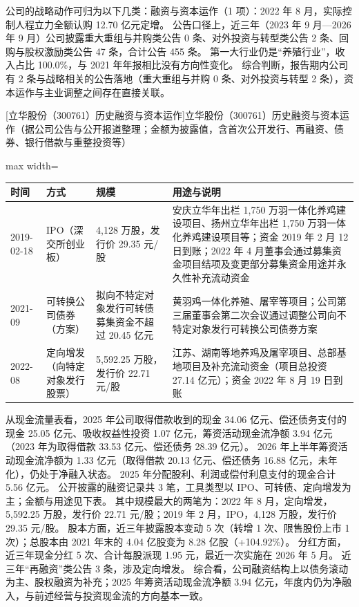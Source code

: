  公司的战略动作可归为以下几类：融资与资本运作（1 项）：2022 年 8 月，实际控制人程立力全额认购 12.70 亿元定增。 公告口径上，近三年（2023 年 9 月---2026 年 9 月）公司披露重大重组与并购类公告 0 条、对外投资与转型类公告 2 条、回购与股权激励类公告 47 条，合计公告 455 条。 第一大行业仍是“养殖行业”，收入占比 100.0\%，与 2021 年年报相比没有方向性变化。 综合判断，报告期内公司有 2 条与战略相关的公告落地（重大重组与并购 0 条、对外投资与转型 2 条），资本运作与主业调整之间存在直接关联。

\begin{center}\small\setlength{\tabcolsep}{4pt}
[立华股份（300761）历史融资与资本运作]{立华股份（300761）历史融资与资本运作（据公司公告与公开报道整理；金额为披露值，含首次公开发行、再融资、债券、银行借款与重整投资等）}
\begin{adjustbox}{max width=\textwidth}
\begin{tabular}{@{}p{1.45cm}p{2.55cm}p{4.05cm}p{4.95cm}@{}}
\toprule
时间 & 方式 & 规模 & 用途与说明 \\
\midrule
2019-02-18 & IPO（深交所创业板） & 4,\allowbreak{}128 万股，\allowbreak{}发行价 29.35 元/\allowbreak{}股 & 安庆立华年出栏 1,\allowbreak{}750 万羽一体化养鸡建设项目、\allowbreak{}扬州立华年出栏 1,\allowbreak{}750 万羽一体化养鸡建设项目等；资金 2019 年 2 月 12 日到账；2022 年 4 月董事会通过募集资金项目结项及变更部分募集资金用途并永久性补充流动资金 \\
2021-09 & 可转换公司债券（方案） & 拟向不特定对象发行可转债募集资金不超过 20.45 亿元 & 黄羽鸡一体化养殖、\allowbreak{}屠宰等项目；公司第三届董事会第二次会议通过调整公司向不特定对象发行可转换公司债券方案 \\
2022-08 & 定向增发（向特定对象发行股票） & 5,\allowbreak{}592.25 万股，\allowbreak{}发行价 22.71 元/\allowbreak{}股 & 江苏、\allowbreak{}湖南等地养鸡及屠宰项目、\allowbreak{}总部基地项目及补充流动资金（项目总投资 27.14 亿元）；资金 2022 年 8 月 19 日到账 \\
\bottomrule
\end{tabular}
\end{adjustbox}
\end{center}

 从现金流量表看，2025 年公司取得借款收到的现金 34.06 亿元、偿还债务支付的现金 25.05 亿元、吸收权益性投资 1.07 亿元，筹资活动现金流净额 3.94 亿元（2023 年为取得借款 33.53 亿元、偿还债务 28.39 亿元）。 2026 年上半年筹资活动现金流净额为 1.33 亿元（取得借款 20.13 亿元、偿还债务 16.88 亿元，未年化），仍处于净融入状态。 2025 年分配股利、利润或偿付利息支付的现金合计 5.56 亿元。 公开披露的融资记录共 3 笔，工具类型以 IPO、可转债、定向增发为主；金额与用途见下表。 其中规模最大的两笔为：2022 年 8 月，定向增发，5,592.25 万股，发行价 22.71 元/股；2019 年 2 月，IPO，4,128 万股，发行价 29.35 元/股。 股本方面，近三年披露股本变动 5 次（转增 1 次、限售股份上市 1 次）；总股本由 2021 年末的 4.04 亿股变为 8.28 亿股（+104.92\%）。 分红方面，近三年现金分红 5 次、合计每股派现 1.95 元，最近一次实施在 2026 年 5 月。 近三年“再融资”类公告 3 条，涉及定向增发。 综合看，公司融资结构上以债务滚动为主、股权融资为补充；2025 年筹资活动现金流净额 3.94 亿元，年度内仍为净融入，与前述经营与投资现金流的方向基本一致。

